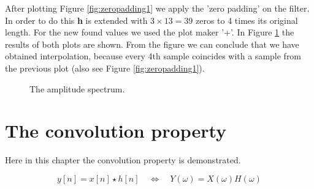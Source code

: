 \documentclass[final]{scrreprt} %
\begin{document}
After plotting Figure \ref{fig:zeropadding1} we apply the 'zero padding' on the filter. 
In order to do this \textbf{h} is extended with $3\times 13 = 39$ zeros to 4 times its original length.
For the new found values we used the plot maker '+'.
In Figure \ref{fig:zeropadding2} the results of both plots are shown. 
From the figure we can conclude that we have obtained interpolation, because every 4th sample coincides with a sample from the previous plot (also see Figure \ref{fig:zeropadding1}).

\begin{figure}[H]
	\centering
	\setlength\figureheight{6cm}
  	\setlength\figurewidth{10cm}
	
	\caption{The amplitude spectrum.}
	\label{fig:zeropadding2}
\end{figure}


\section{The convolution property}
Here in this chapter the convolution property is demonstrated. 




\begin{equation}
y[n] = x[n]\star h[n] \quad \Leftrightarrow \quad Y(\omega) = X(\omega)H(\omega) 
\label{equ:convprop}
\end{equation}
\end{document}
